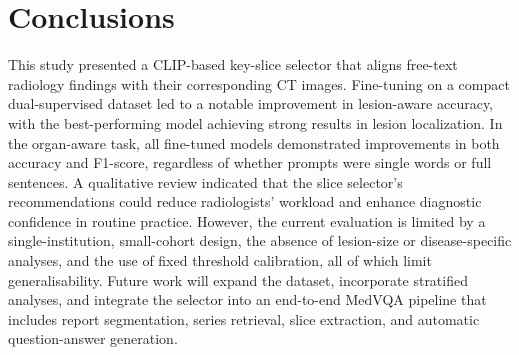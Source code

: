 \documentclass[bioengineering,article,submit,pdftex,moreauthors]{Definitions/mdpi}
\begin{document}
\section{Conclusions}

This study presented a CLIP-based key-slice selector that aligns free-text radiology findings with their corresponding CT images. Fine-tuning on a compact dual-supervised dataset led to a notable improvement in lesion-aware accuracy, with the best-performing model achieving strong results in lesion localization. In the organ-aware task, all fine-tuned models demonstrated improvements in both accuracy and F1-score, regardless of whether prompts were single words or full sentences. A qualitative review indicated that the slice selector’s recommendations could reduce radiologists’ workload and enhance diagnostic confidence in routine practice. However, the current evaluation is limited by a single-institution, small-cohort design, the absence of lesion-size or disease-specific analyses, and the use of fixed threshold calibration, all of which limit generalisability. Future work will expand the dataset, incorporate stratified analyses, and integrate the selector into an end-to-end MedVQA pipeline that includes report segmentation, series retrieval, slice extraction, and automatic question-answer generation.

\vspace{6pt} 



\end{document}
